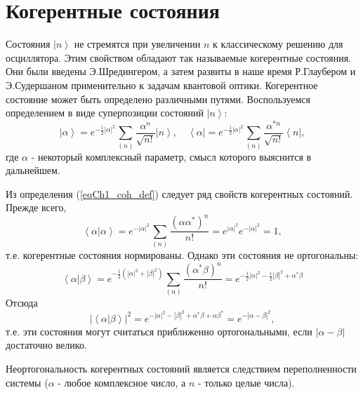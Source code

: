 \section{Когерентные состояния}
Состояния $\left|n\right>$  не стремятся при увеличении $n$  к
классическому решению для осциллятора. Этим свойством обладают так
называемые когерентные состояния. Они были введены Э.Шредингером, а
затем развиты в наше время Р.Глаубером
\cite{bQuantumOpticsAndRadioPhisicsLecture1966} и Э.Судершаном 
\cite{bKaluderSudershan1970} применительно к задачам квантовой
оптики. Когерентное   состояние может быть определено различными
путями. Воспользуемся определением в виде суперпозиции состояний
$\left|n\right>$:
\begin{equation}
\left|\alpha\right> = e^{-\frac{1}{2} \left|\alpha\right|^2}
\sum_{(n)} \frac{\alpha^n}{\sqrt{n!}}\left|n\right>,
\quad
\left<\alpha\right| = e^{-\frac{1}{2} \left|\alpha\right|^2}
\sum_{(n)} \frac{\alpha^{*n}}{\sqrt{n!}}\left<n\right|,
\label{eqCh1_coh_def}
\end{equation}
где $\alpha$ -  некоторый комплексный параметр, смысл которого
выяснится в дальнейшем. 

Из определения (\ref{eqCh1_coh_def}) следует ряд свойств когерентных
состояний. Прежде  всего,
\begin{equation}
\left<\alpha\right|\left.\alpha\right> = 
e^{-\left|\alpha\right|^2}\sum_{(n)}
\frac{\left(\alpha\alpha^{*}\right)^n}{n!} = 
e^{\left|\alpha\right|^2} e^{-\left|\alpha\right|^2} = 1,
\end{equation}
т.е. когерентные состояния нормированы. Однако эти состояния не
ортогональны: 
\begin{equation}
\left<\alpha\right|\left.\beta\right> = 
e^{-\frac{1}{2}\left(\left|\alpha\right|^2 +
  \left|\beta\right|^2\right)}\sum_{(n)} 
\frac{\left(\alpha^{*}\beta\right)^n}{n!} = 
e^{
-\frac{1}{2} \left|\alpha\right|^2  -\frac{1}{2} \left|\beta\right|^2
+
\alpha^{*} \beta 
}
\label{eqCh1_ortog}
\end{equation}
Отсюда
\begin{equation}
\left|\left<\alpha\right|\left.\beta\right>\right|^2 = 
e^{
-\left|\alpha\right|^2  - \left|\beta\right|^2
+
\alpha^{*} \beta  + \alpha \beta^{*}} = 
e^{-\left|\alpha - \beta\right|^2}, 
\end{equation}
т.е. эти состояния могут считаться приближенно ортогональными, если
$\left|\alpha - \beta\right|$  достаточно велико. 

Неортогональность когерентных состояний является следствием
переполненности системы ($\alpha$ -  любое комплексное число, а  $n$ -
только целые числа). 

